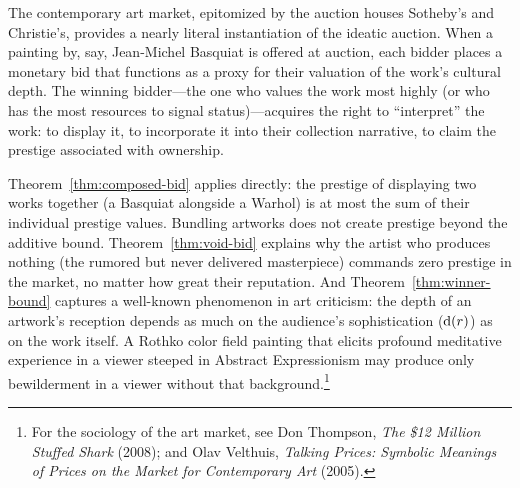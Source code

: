 \begin{example}
\label{ex:art-market}
The contemporary art market, epitomized by the auction houses Sotheby's
and Christie's, provides a nearly literal instantiation of the ideatic
auction.  When a painting by, say, Jean-Michel Basquiat is offered at
auction, each bidder places a monetary bid that functions as a proxy for
their valuation of the work's cultural depth.  The winning bidder---the
one who values the work most highly (or who has the most resources to
signal status)---acquires the right to ``interpret'' the work: to display
it, to incorporate it into their collection narrative, to claim the
prestige associated with ownership.

Theorem~\ref{thm:composed-bid} applies directly: the prestige of
displaying two works together (a Basquiat alongside a Warhol) is at most
the sum of their individual prestige values.  Bundling artworks does not
create prestige beyond the additive bound.  Theorem~\ref{thm:void-bid}
explains why the artist who produces nothing (the rumored but never
delivered masterpiece) commands zero prestige in the market, no matter
how great their reputation.  And Theorem~\ref{thm:winner-bound} captures
a well-known phenomenon in art criticism: the depth of an artwork's
reception depends as much on the audience's sophistication ($\operatorname{d}(r)$)
as on the work itself.  A Rothko color field painting that elicits
profound meditative experience in a viewer steeped in Abstract
Expressionism may produce only bewilderment in a viewer without that
background.\footnote{For the sociology of the art market, see Don Thompson,
\textit{The \$12 Million Stuffed Shark} (2008); and Olav Velthuis,
\textit{Talking Prices: Symbolic Meanings of Prices on the Market for
Contemporary Art} (2005).}
\end{example}

